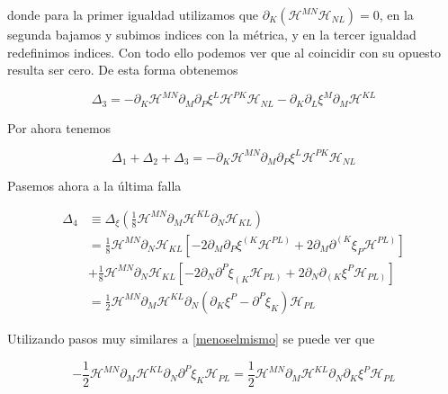 \documentclass{article}
\numberwithin{equation}{section}
\begin{document}
donde para la primer igualdad utilizamos que $ \partial_K\left( \mathcal{H}^{MN}\mathcal{H}_{NL}\right) = 0 $, en la segunda bajamos y subimos indices con la métrica, y en la tercer igualdad redefinimos indices. Con todo ello podemos ver que al coincidir con su opuesto resulta ser cero. De esta forma obtenemos

\begin{equation}\label{key}
\Delta_3 = -\partial_K \mathcal{H}^{MN}\partial_M\partial_P \xi^L \mathcal{H}^{PK}\mathcal{H}_{NL} - \partial_K\partial_L\xi^M\partial_M\mathcal{H}^{KL}
\end{equation}

Por ahora tenemos

\begin{equation}\label{key}
\Delta_1 + \Delta_2 + \Delta_3 = -\partial_K \mathcal{H}^{MN}\partial_M\partial_P \xi^L \mathcal{H}^{PK}\mathcal{H}_{NL}
\end{equation}

Pasemos ahora a la última falla

\begin{equation}\label{key}
\begin{aligned}
\Delta_4 &\equiv \Delta_{\xi} \left( \frac{1}{8} \mathcal{H}^{MN}\partial_M \mathcal{H}^{KL}\partial_N \mathcal{H}_{KL} \right)\\
&= \frac{1}{8} \mathcal{H}^{MN}\partial_N \mathcal{H}_{KL} \left[ - 2\partial_M \partial_P \xi^{\left(K\right.} \mathcal{H}^{\left.PL\right)} + 2\partial_M \partial^{\left(K\right.}\xi_P \mathcal{H}^{\left.PL\right)}  \right]\\
&+ \frac{1}{8} \mathcal{H}^{MN}\partial_N \mathcal{H}_{KL} \left[ - 2\partial_N \partial^P \xi_{\left(K\right.} \mathcal{H}_{\left.PL\right)} + 2\partial_N \partial_{\left(K\right.}\xi^P \mathcal{H}_{\left.PL\right)}  \right]\\
&= \frac{1}{2}\mathcal{H}^{MN}\partial_M \mathcal{H}^{KL}\partial_N \left( \partial_K \xi^P - \partial^P \xi_K\right)\mathcal{H}_{PL}
\end{aligned}
\end{equation}

Utilizando pasos muy similares a \ref{menoselmismo} se puede ver que

\begin{equation}\label{key}
 - \frac{1}{2}\mathcal{H}^{MN}\partial_M \mathcal{H}^{KL}\partial_N\partial^P \xi_K\mathcal{H}_{PL} = \frac{1}{2}\mathcal{H}^{MN}\partial_M \mathcal{H}^{KL}\partial_N\partial_K \xi^P\mathcal{H}_{PL}
\end{equation}
\end{document}
